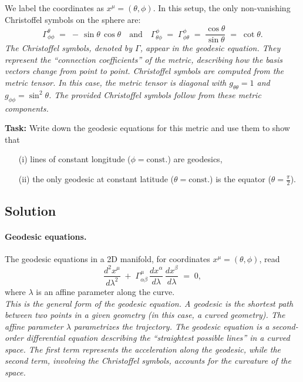 We label the coordinates as \(x^{\mu} = (\theta, \phi)\). In this setup, the only non-vanishing Christoffel symbols on the sphere are:
\[
\Gamma_{\phi \phi}^{\theta}
\;=\; -\,\sin\theta\,\cos\theta
\quad\text{and}\quad
\Gamma_{\theta \phi}^{\phi}
\;=\; \Gamma_{\phi \theta}^{\phi}
\;=\; \frac{\cos\theta}{\sin\theta}
\;=\; \cot\theta.
\]
\emph{The Christoffel symbols, denoted by \(\Gamma\), appear in the geodesic equation. They represent the ``connection coefficients'' of the metric, describing how the basis vectors change from point to point. Christoffel symbols are computed from the metric tensor. In this case, the metric tensor is diagonal with \(g_{\theta\theta} = 1\) and \(g_{\phi\phi} = \sin^2\theta\). The provided Christoffel symbols follow from these metric components.}

\bigskip

\textbf{Task:} Write down the geodesic equations for this metric and use them to show that
\begin{enumerate}
\item[(i)] lines of constant longitude (\(\phi=\text{const.}\)) are geodesics,
\item[(ii)] the only geodesic at constant latitude (\(\theta = \text{const.}\)) is the equator (\(\theta = \tfrac{\pi}{2}\)).
\end{enumerate}

\subsection*{Solution}

\paragraph{Geodesic equations.}
The geodesic equations in a 2D manifold, for coordinates \(x^\mu=(\theta,\phi)\), read
\[
\frac{d^2 x^\mu}{d\lambda^2}
\;+\;
\Gamma_{\alpha\beta}^\mu \,\frac{dx^\alpha}{d\lambda}\,\frac{dx^\beta}{d\lambda}
\;=\; 0,
\]
where \(\lambda\) is an affine parameter along the curve.\\
\emph{This is the general form of the geodesic equation. A geodesic is the shortest path between two points in a given geometry (in this case, a curved geometry). The affine parameter \(\lambda\) parametrizes the trajectory. The geodesic equation is a second-order differential equation describing the ``straightest possible lines'' in a curved space. The first term represents the acceleration along the geodesic, while the second term, involving the Christoffel symbols, accounts for the curvature of the space.}

